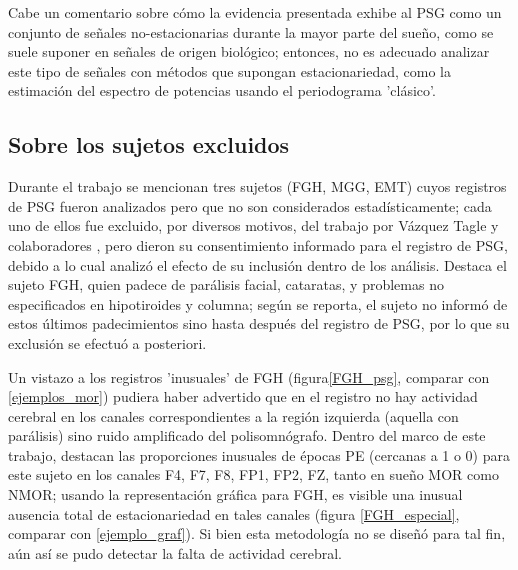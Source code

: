 Cabe un comentario sobre cómo la evidencia presentada exhibe al PSG como un conjunto de señales 
no-estacionarias durante la mayor parte del sueño, como se suele suponer en señales de origen 
biológico; entonces, no es adecuado analizar este tipo de señales con métodos que supongan 
estacionariedad, como la estimación del espectro de potencias usando el periodograma 'clásico'. 


\subsection{Sobre los sujetos excluidos}

Durante el trabajo se mencionan tres sujetos (FGH, MGG, EMT) cuyos registros de PSG fueron 
analizados pero que no son considerados estadísticamente; cada uno de ellos fue excluido, por 
diversos motivos, del trabajo por Vázquez Tagle y colaboradores \cite{VazquezTagle16}, pero 
dieron su consentimiento informado para el registro de PSG, debido a lo cual analizó el efecto de 
su inclusión dentro de los análisis.
Destaca el sujeto FGH, quien padece de parálisis facial, cataratas, y problemas no especificados 
en hipotiroides y columna; según se reporta, el sujeto no informó de estos últimos 
padecimientos sino hasta después del registro de PSG, por lo que su exclusión se efectuó a 
posteriori.

Un vistazo a los registros 'inusuales' de FGH (figura\ref{FGH_psg}, comparar con 
\ref{ejemplos_mor}) pudiera haber advertido que en el registro no hay actividad cerebral en los 
canales correspondientes a la región izquierda (aquella con parálisis) sino ruido amplificado 
del polisomnógrafo.
Dentro del marco de este trabajo, destacan las proporciones inusuales de épocas PE (cercanas a 1 
o 0) para este sujeto en los canales F4, F7, F8, FP1, FP2, FZ, tanto en sueño MOR como NMOR; 
usando la representación gráfica para FGH, es visible una inusual ausencia total de 
estacionariedad en tales canales (figura \ref{FGH_especial}, comparar con \ref{ejemplo_graf}). 
Si bien esta metodología no se diseñó para tal fin, aún así se pudo detectar la falta de 
actividad cerebral.

